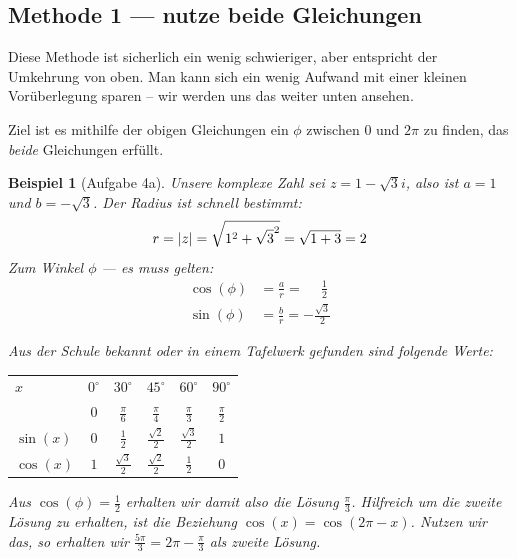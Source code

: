 \documentclass[ngerman, a4paper, 11pt]{article}
\theoremstyle{nonumberplain}
\newtheorem{beispiel}{Beispiel}
\renewcommand{\i}{i}
\begin{document}
	\subsection*{Methode 1 --- nutze beide Gleichungen}
	Diese Methode ist sicherlich ein wenig schwieriger, aber entspricht der Umkehrung von oben. Man kann sich ein wenig Aufwand mit einer kleinen Vorüberlegung sparen -- wir werden uns das weiter unten ansehen.
	
	Ziel ist es mithilfe der obigen Gleichungen ein $\phi$ zwischen $0$ und $2\pi$ zu finden, das \textit{beide} Gleichungen erfüllt.
	
	\begin{beispiel}[Aufgabe 4a]
		Unsere komplexe Zahl sei $z = 1 - \sqrt{3} \i$, also ist $a = 1$ und $b = -\sqrt{3}$. Der Radius ist schnell bestimmt:
		\begin{equation*}
			r = \left| z \right| = \sqrt{1^2 + \sqrt{3}^2} = \sqrt{1 + 3} = 2
		\end{equation*}
		Zum Winkel $\phi$ --- es muss gelten:
		\begin{align*}
			\cos(\phi) &= \frac{a}{r} = \phantom{-}\frac{1}{2} \\
			\sin(\phi) &= \frac{b}{r}  = -\frac{\sqrt{3}}{2}
		\end{align*}
	
		Aus der Schule bekannt oder in einem Tafelwerk gefunden sind folgende Werte:
		\begin{center}
			\begin{tabular}{l|ccccc}
				$x$       & $0^\circ$ & $30^\circ$           & $45^\circ$           & $60^\circ$           & $90^\circ$      \\ 
				& $0$       & $\frac{\pi}{6}$      & $\frac{\pi}{4}$      & $\frac{\pi}{3}$      & $\frac{\pi}{2}$ \\ \hline
				$\sin(x)$ & $0$       & $\frac{1}{2}$        & $\frac{\sqrt{2}}{2}$ & $\frac{\sqrt{3}}{2}$ & $1$             \\
				$\cos(x)$ & $1$       & $\frac{\sqrt{3}}{2}$ & $\frac{\sqrt{2}}{2}$ & $\frac{1}{2}$        & $0$             \\
			\end{tabular}
		\end{center}
		
		\begin{minipage}{\dimexpr0.5\linewidth-\fboxrule-\fboxsep}		
			Aus $\cos(\phi) = \frac{1}{2}$ erhalten wir damit also die Lösung $\frac{\pi}{3}$. Hilfreich um die zweite Lösung zu erhalten, ist die Beziehung $\cos(x) = \cos(2\pi - x)$. Nutzen wir das, so erhalten wir $\frac{5\pi}{3} = 2\pi - \frac{\pi}{3}$ als zweite Lösung. 
			

\end{minipage}
\end{beispiel}
\end{document}
